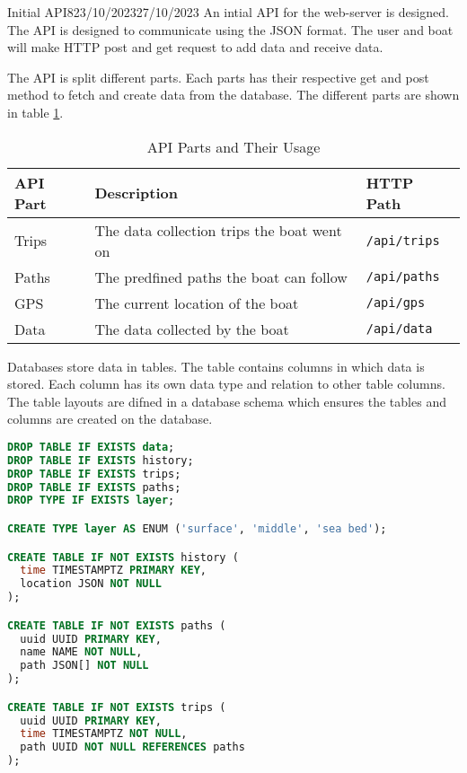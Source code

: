 \documentclass[12pt]{article}
\begin{document}
\begin{logbook-entry}{Initial API}{8}{23/10/2023}{27/10/2023}
An intial API for the web-server is designed.    
The API is designed to communicate using the JSON format.
The user and boat will make HTTP post and get request to add data and receive data.

The API is split different parts.
Each parts has their respective get and post method to fetch and create data from the database.
The different parts are shown in table \ref{tab:api-parts}.

\begin{table}[H]
    \centering{}
    \caption{API Parts and Their Usage}
    \label{tab:api-parts}
    \begin{tabularx}{\textwidth}{m{5em} X X}
        \hline
        API Part & Description & HTTP Path\\
        \hline
        Trips & The data collection trips the boat went on & \lstinline{/api/trips}\\
        Paths & The predfined paths the boat can follow & \lstinline{/api/paths}\\
        GPS & The current location of the boat & \lstinline{/api/gps}\\
        Data & The data collected by the boat & \lstinline{/api/data}\\
        \hline
    \end{tabularx}
\end{table}

Databases store data in tables.
The table contains columns in which data is stored.
Each column has its own data type and relation to other table columns.
The table layouts are difned in a database schema which ensures the tables and columns are created on the database.

\begin{lstlisting}[language=sql,caption={Database Schema of the Database}]
DROP TABLE IF EXISTS data;
DROP TABLE IF EXISTS history;
DROP TABLE IF EXISTS trips;
DROP TABLE IF EXISTS paths;
DROP TYPE IF EXISTS layer;

CREATE TYPE layer AS ENUM ('surface', 'middle', 'sea bed');

CREATE TABLE IF NOT EXISTS history (
  time TIMESTAMPTZ PRIMARY KEY,
  location JSON NOT NULL
);

CREATE TABLE IF NOT EXISTS paths (
  uuid UUID PRIMARY KEY,
  name NAME NOT NULL,
  path JSON[] NOT NULL
);

CREATE TABLE IF NOT EXISTS trips (
  uuid UUID PRIMARY KEY,
  time TIMESTAMPTZ NOT NULL,
  path UUID NOT NULL REFERENCES paths
);


\end{lstlisting}
\end{logbook-entry}
\end{document}
